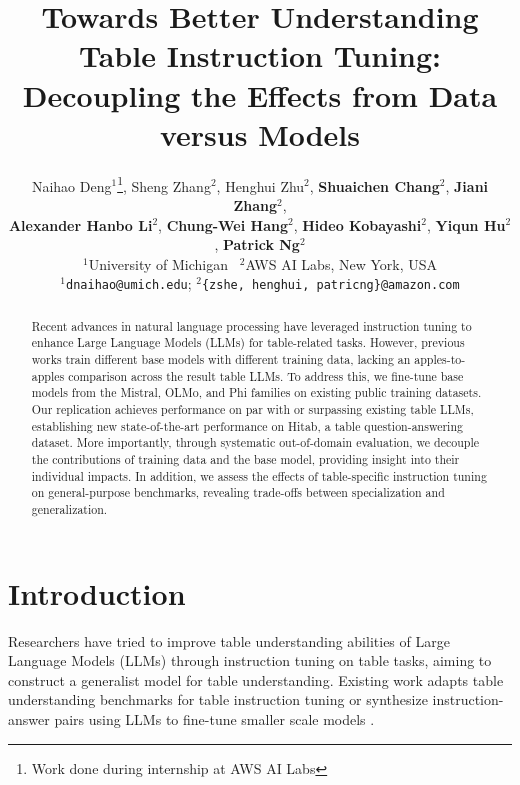 \documentclass[11pt]{article}
\title{Towards Better Understanding Table Instruction Tuning: Decoupling the Effects from Data versus Models}
\author{Naihao Deng$^{1}$\thanks{Work done during internship at AWS AI Labs}, Sheng Zhang$^{2}$, Henghui Zhu$^{2}$, \textbf{Shuaichen Chang}$^{2}$, \textbf{Jiani Zhang}$^{2}$,\\
\textbf{Alexander Hanbo Li}$^{2}$, \textbf{Chung-Wei Hang}$^{2}$, \textbf{Hideo Kobayashi}$^{2}$, \textbf{Yiqun Hu}$^{2}$, \textbf{Patrick Ng}$^{2}$ \\
$^{1}$University of Michigan \ $^{2}$AWS AI Labs, New York, USA\\
$^{1}$\texttt{dnaihao@umich.edu}; 
$^{2}$\texttt{\{zshe, henghui, patricng\}@amazon.com} \\
}
\newcommand{\dnaihao}[1]{\textcolor{blue}{[naihao: #1]}}
\newcommand{\patricng}[1]{\textcolor{teal}{[PN: #1]}}
\begin{document}
\maketitle

\begin{abstract}

Recent advances in natural language processing have leveraged instruction tuning to enhance Large Language Models (LLMs) for table-related tasks. 
However, previous works train different base models with different training data, lacking an apples-to-apples comparison across the result table LLMs. 
To address this, we fine-tune base models from the Mistral, OLMo, and Phi families on existing public training datasets. 
Our replication achieves performance on par with or surpassing existing table LLMs, establishing new state-of-the-art performance on Hitab, a table question-answering dataset.
More importantly, through systematic out-of-domain evaluation, we decouple the contributions of training data and the base model, providing insight into their individual impacts.
In addition, we assess the effects of table-specific instruction tuning on general-purpose benchmarks, revealing trade-offs between specialization and generalization.

\end{abstract}

\section{Introduction}
Researchers have tried to improve table understanding abilities of Large Language Models (LLMs) through instruction tuning on table tasks, aiming to construct a generalist model for table understanding.
Existing work adapts table understanding benchmarks for table instruction tuning \citep{zhang-etal-2024-tablellama, zheng2024multimodal} or synthesize instruction-answer pairs using LLMs to fine-tune smaller scale models \citep{li2023table, zhang2024tablellm, wu2024tablebenchcomprehensivecomplexbenchmark}.
\end{document}
